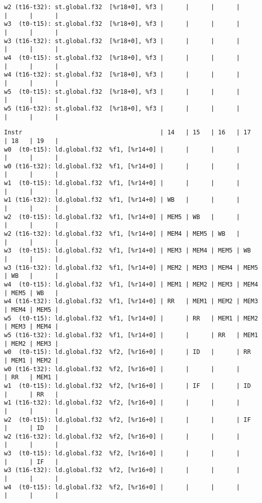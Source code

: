 \documentclass[11pt]{article}
\begin{document}
\begin{Answer}
\begin{verbatim}
w2 (t16-t32): st.global.f32  [%r18+0], %f3 |      |      |      |      |      |      |
w3  (t0-t15): st.global.f32  [%r18+0], %f3 |      |      |      |      |      |      |
w3 (t16-t32): st.global.f32  [%r18+0], %f3 |      |      |      |      |      |      |
w4  (t0-t15): st.global.f32  [%r18+0], %f3 |      |      |      |      |      |      |
w4 (t16-t32): st.global.f32  [%r18+0], %f3 |      |      |      |      |      |      |
w5  (t0-t15): st.global.f32  [%r18+0], %f3 |      |      |      |      |      |      |
w5 (t16-t32): st.global.f32  [%r18+0], %f3 |      |      |      |      |      |      |
\end{verbatim}
\newpage
\begin{verbatim}
Instr                                      | 14   | 15   | 16   | 17   | 18   | 19   |
w0  (t0-t15): ld.global.f32  %f1, [%r14+0] |      |      |      |      |      |      |
w0 (t16-t32): ld.global.f32  %f1, [%r14+0] |      |      |      |      |      |      |
w1  (t0-t15): ld.global.f32  %f1, [%r14+0] |      |      |      |      |      |      |
w1 (t16-t32): ld.global.f32  %f1, [%r14+0] | WB   |      |      |      |      |      |
w2  (t0-t15): ld.global.f32  %f1, [%r14+0] | MEM5 | WB   |      |      |      |      |
w2 (t16-t32): ld.global.f32  %f1, [%r14+0] | MEM4 | MEM5 | WB   |      |      |      |
w3  (t0-t15): ld.global.f32  %f1, [%r14+0] | MEM3 | MEM4 | MEM5 | WB   |      |      |
w3 (t16-t32): ld.global.f32  %f1, [%r14+0] | MEM2 | MEM3 | MEM4 | MEM5 | WB   |      |
w4  (t0-t15): ld.global.f32  %f1, [%r14+0] | MEM1 | MEM2 | MEM3 | MEM4 | MEM5 | WB   |
w4 (t16-t32): ld.global.f32  %f1, [%r14+0] | RR   | MEM1 | MEM2 | MEM3 | MEM4 | MEM5 |
w5  (t0-t15): ld.global.f32  %f1, [%r14+0] |      | RR   | MEM1 | MEM2 | MEM3 | MEM4 |
w5 (t16-t32): ld.global.f32  %f1, [%r14+0] |      |      | RR   | MEM1 | MEM2 | MEM3 |
w0  (t0-t15): ld.global.f32  %f2, [%r16+0] |      | ID   |      | RR   | MEM1 | MEM2 |
w0 (t16-t32): ld.global.f32  %f2, [%r16+0] |      |      |      |      | RR   | MEM1 |
w1  (t0-t15): ld.global.f32  %f2, [%r16+0] |      | IF   |      | ID   |      | RR   |
w1 (t16-t32): ld.global.f32  %f2, [%r16+0] |      |      |      |      |      |      |
w2  (t0-t15): ld.global.f32  %f2, [%r16+0] |      |      |      | IF   |      | ID   |
w2 (t16-t32): ld.global.f32  %f2, [%r16+0] |      |      |      |      |      |      |
w3  (t0-t15): ld.global.f32  %f2, [%r16+0] |      |      |      |      |      | IF   |
w3 (t16-t32): ld.global.f32  %f2, [%r16+0] |      |      |      |      |      |      |
w4  (t0-t15): ld.global.f32  %f2, [%r16+0] |      |      |      |      |      |      |

\end{verbatim}
\end{Answer}
\end{document}
